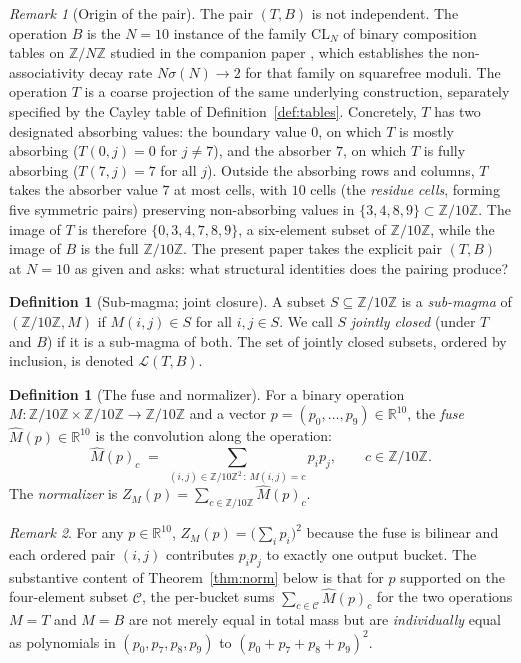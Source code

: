 \documentclass[11pt,reqno]{amsart}
\theoremstyle{plain}
\theoremstyle{definition}
\newtheorem{definition}[theorem]{Definition}
\theoremstyle{remark}
\newtheorem*{remark}{Remark}
\newcommand{\Z}{\mathbb{Z}}
\newcommand{\R}{\mathbb{R}}
\newcommand{\Zten}{\Z/10\Z}
\newcommand{\Cfour}{\mathcal{C}}
\newcommand{\CL}{\mathrm{CL}}
\begin{document}
\begin{remark}[Origin of the pair]
The pair $(T,B)$ is not independent. The operation $B$ is the
$N=10$ instance of the family $\CL_{N}$ of binary composition
tables on $\Z/N\Z$ studied in the companion paper
\cite{SandersGish2026Sigma}, which establishes the
non-associativity decay rate $N\sigma(N)\to 2$ for that family on
squarefree moduli. The operation $T$ is a coarse projection of
the same underlying construction, separately specified by the
Cayley table of Definition~\ref{def:tables}. Concretely, $T$ has
two designated absorbing values: the boundary value $0$, on which
$T$ is mostly absorbing ($T(0,j)=0$ for $j\neq 7$), and the
absorber $7$, on which $T$ is fully absorbing ($T(7,j)=7$ for all
$j$). Outside the absorbing rows and columns, $T$ takes the
absorber value $7$ at most cells, with $10$ cells (the
\emph{residue cells}, forming five symmetric pairs) preserving
non-absorbing values in $\{3,4,8,9\}\subset\Zten$. The image of
$T$ is therefore $\{0,3,4,7,8,9\}$, a six-element subset of
$\Zten$, while the image of $B$ is the full $\Zten$. The present
paper takes the explicit pair $(T,B)$ at $N=10$ as given and
asks: what structural identities does the pairing produce?
\end{remark}

\begin{definition}[Sub-magma; joint closure]\label{def:submagma}
A subset $S\subseteq\Zten$ is a \emph{sub-magma} of
$(\Zten,M)$ if $M(i,j)\in S$ for all $i,j\in S$. We call $S$
\emph{jointly closed} (under $T$ and $B$) if it is a sub-magma
of both. The set of jointly closed subsets, ordered by inclusion,
is denoted $\mathcal{L}(T,B)$.
\end{definition}

\begin{definition}[The fuse and normalizer]\label{def:fuse}
For a binary operation $M:\Zten\times\Zten\to\Zten$ and a vector
$p=(p_{0},\dots,p_{9})\in\R^{10}$, the \emph{fuse}
$\widehat{M}(p)\in\R^{10}$ is the convolution along the
operation:
\[
\widehat{M}(p)_{c}\;=\;\sum_{(i,j)\in\Zten^{2}\,:\,M(i,j)=c}p_{i}p_{j},\qquad c\in\Zten.
\]
The \emph{normalizer} is
$Z_{M}(p)=\sum_{c\in\Zten}\widehat{M}(p)_{c}$.
\end{definition}

\begin{remark}
For any $p\in\R^{10}$, $Z_{M}(p)=\bigl(\sum_{i}p_{i}\bigr)^{2}$
because the fuse is bilinear and each ordered pair $(i,j)$
contributes $p_{i}p_{j}$ to exactly one output bucket. The
substantive content of Theorem~\ref{thm:norm} below is that for
$p$ supported on the four-element subset $\Cfour$, the per-bucket
sums $\sum_{c\in\Cfour}\widehat{M}(p)_{c}$ for the two operations
$M=T$ and $M=B$ are not merely equal in total mass but are
\emph{individually} equal as polynomials in $(p_{0},p_{7},p_{8},p_{9})$
to $(p_{0}+p_{7}+p_{8}+p_{9})^{2}$.
\end{remark}
\end{document}
